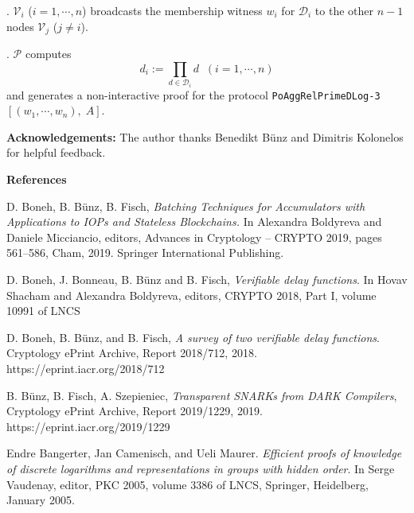 \documentclass[11pt, lettersize, notitlepage, leqno, footskip=0.6cm]{article}
\newcommand{\pl}{\prod\limits}
\newcommand{\mc}{\mathcal}
\newcommand{\mP}{\mc{P}}
\newcommand{\V}{\mc{V}}
\newcommand{\vs}{\vspace{-0.15cm}}
\newcommand{\noin}{\noindent}
\numberwithin{equation}{section}
\begin{document}
\noin 1. $\V_i$ ($i=1,\cdots,n$) broadcasts the membership witness $w_i$ for $\mc{D}_i$ to the other $n-1$ nodes $\V_j$ ($j\neq i$). 

\noin 2. $\mP$ computes \vs $$d_i:= \pl_{d\in\mc{D}_i} d\;\;(i=1,\cdots,n)$$ and generates a non-interactive proof for the protocol \verb|PoAggRelPrimeDLog-3|$[(w_1,\cdots,w_n),\; A]$.




\bigskip


\bigskip

\bigskip

\noin \textbf{Acknowledgements:} The author thanks Benedikt B\"{u}nz and Dimitris Kolonelos for helpful feedback.

\bigskip



\begin{center}\textbf{References} \end{center}
\footnotesize

\noindent [BBF19] D. Boneh, B. B\"{u}nz, B. Fisch, \textit{Batching Techniques for Accumulators with Applications to IOPs and Stateless Blockchains.} In Alexandra Boldyreva and Daniele Micciancio, editors, Advances in Cryptology – CRYPTO 2019, pages 561–586, Cham, 2019. Springer International Publishing. \vspace{0.1cm}

\noin [BBBF18] D. Boneh, J. Bonneau, B. B\"{u}nz and B. Fisch, \textit{Verifiable delay functions}. In Hovav Shacham and Alexandra Boldyreva, editors, CRYPTO 2018, Part I, volume 10991 of LNCS \vspace{0.1cm}

\noin [BBF18] D. Boneh, B. B\"{u}nz, and B. Fisch, \textit{A survey of two verifiable delay functions}. Cryptology ePrint Archive, Report 2018/712, 2018. https://eprint.iacr.org/2018/712 \vspace{0.1cm}

\noindent [BFS19] B. B\"{u}nz, B. Fisch, A. Szepieniec, \textit{Transparent SNARKs from DARK Compilers}, Cryptology ePrint Archive, Report 2019/1229, 2019. https://eprint.iacr.org/2019/1229 \vspace{0.1cm}

\noin [BCM05] Endre Bangerter, Jan Camenisch, and Ueli Maurer. \textit{Efficient proofs of knowledge of discrete logarithms and representations in groups with hidden order}. In Serge Vaudenay, editor, PKC 2005, volume 3386 of LNCS, Springer, Heidelberg, January 2005.\vspace{0.1cm}
\end{document}
